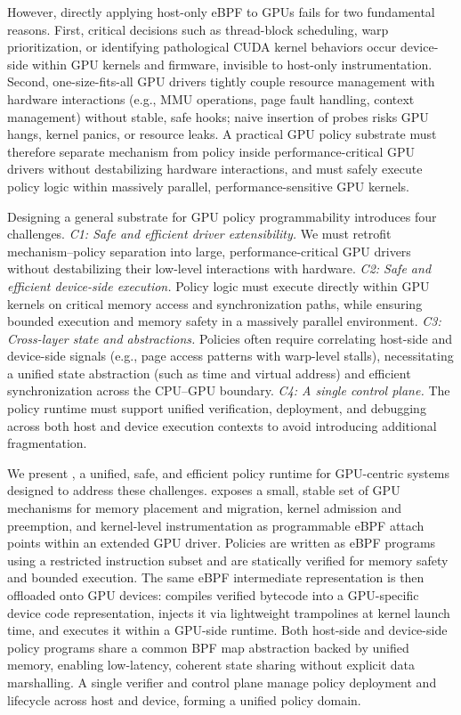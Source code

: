 However, directly applying host-only eBPF to GPUs fails for two fundamental reasons. First, critical decisions such as thread-block scheduling, warp prioritization, or identifying pathological CUDA kernel behaviors occur device-side within GPU kernels and firmware, invisible to host-only instrumentation. Second, one-size-fits-all GPU drivers tightly couple resource management with hardware interactions (e.g., MMU operations, page fault handling, context management) without stable, safe hooks; naive insertion of probes risks GPU hangs, kernel panics, or resource leaks. A practical GPU policy substrate must therefore separate mechanism from policy inside performance-critical GPU drivers without destabilizing hardware interactions, and must safely execute policy logic within massively parallel, performance-sensitive GPU kernels.

Designing a general substrate for GPU policy programmability introduces four challenges. \emph{C1: Safe and efficient driver extensibility.} We must retrofit mechanism–policy separation into large, performance-critical GPU drivers without destabilizing their low-level interactions with hardware. \emph{C2: Safe and efficient device-side execution.} Policy logic must execute directly within GPU kernels on critical memory access and synchronization paths, while ensuring bounded execution and memory safety in a massively parallel environment. \emph{C3: Cross-layer state and abstractions.} Policies often require correlating host-side and device-side signals (e.g., page access patterns with warp-level stalls), necessitating a unified state abstraction (such as time and virtual address) and efficient synchronization across the CPU–GPU boundary. \emph{C4: A single control plane.} The policy runtime must support unified verification, deployment, and debugging across both host and device execution contexts to avoid introducing additional fragmentation.

We present \sys, a unified, safe, and efficient policy runtime for GPU-centric systems designed to address these challenges. \sys exposes a small, stable set of GPU mechanisms for memory placement and migration, kernel admission and preemption, and kernel-level instrumentation as programmable eBPF attach points within an extended GPU driver. Policies are written as eBPF programs using a restricted instruction subset and are statically verified for memory safety and bounded execution. The same eBPF intermediate representation is then offloaded onto GPU devices: \sys compiles verified bytecode into a GPU-specific device code representation, injects it via lightweight trampolines at kernel launch time, and executes it within a GPU-side runtime. Both host-side and device-side policy programs share a common BPF map abstraction backed by unified memory, enabling low-latency, coherent state sharing without explicit data marshalling. A single verifier and control plane manage policy deployment and lifecycle across host and device, forming a unified policy domain.

